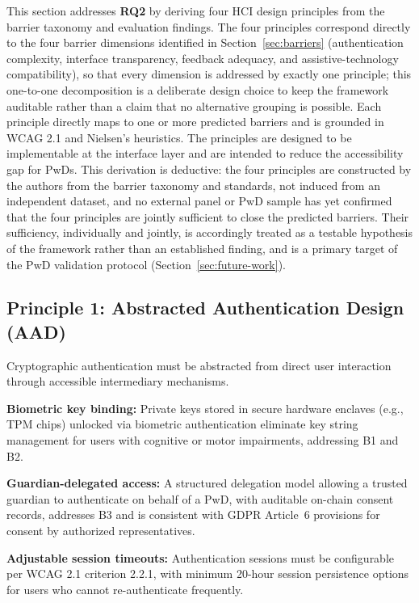 \documentclass[journal,onecolumn]{IEEEtran}
\begin{document}
This section addresses \textbf{RQ2} by deriving four HCI design principles from the barrier taxonomy and evaluation findings. The four principles correspond directly to the four barrier dimensions identified in Section~\ref{sec:barriers} (authentication complexity, interface transparency, feedback adequacy, and assistive-technology compatibility), so that every dimension is addressed by exactly one principle; this one-to-one decomposition is a deliberate design choice to keep the framework auditable rather than a claim that no alternative grouping is possible. Each principle directly maps to one or more predicted barriers and is grounded in WCAG 2.1 and Nielsen's heuristics. The principles are designed to be implementable at the interface layer and are intended to reduce the accessibility gap for PwDs. This derivation is deductive: the four principles are constructed by the authors from the barrier taxonomy and standards, not induced from an independent dataset, and no external panel or PwD sample has yet confirmed that the four principles are jointly sufficient to close the predicted barriers. Their sufficiency, individually and jointly, is accordingly treated as a testable hypothesis of the framework rather than an established finding, and is a primary target of the PwD validation protocol (Section~\ref{sec:future-work}).

\subsection{Principle 1: Abstracted Authentication Design (AAD)}

Cryptographic authentication must be abstracted from direct user interaction through accessible intermediary mechanisms.

\textbf{Biometric key binding:} Private keys stored in secure hardware enclaves (e.g., TPM chips) unlocked via biometric authentication eliminate key string management for users with cognitive or motor impairments, addressing B1 and B2.

\textbf{Guardian-delegated access:} A structured delegation model allowing a trusted guardian to authenticate on behalf of a PwD, with auditable on-chain consent records, addresses B3 and is consistent with GDPR Article~6 provisions for consent by authorized representatives.

\textbf{Adjustable session timeouts:} Authentication sessions must be configurable per WCAG 2.1 criterion 2.2.1, with minimum 20-hour session persistence options for users who cannot re-authenticate frequently.
\end{document}
